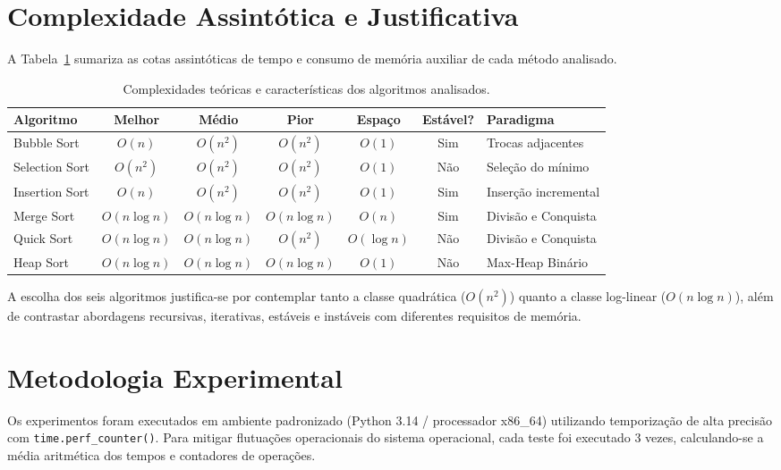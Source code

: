\documentclass[12pt,a4paper]{article}
\begin{document}
\section{Complexidade Assintótica e Justificativa}
A Tabela~\ref{tab:complexidade} sumariza as cotas assintóticas de tempo e consumo de memória auxiliar de cada método analisado.

\begin{table}[H]
\centering
\caption{Complexidades teóricas e características dos algoritmos analisados.}
\label{tab:complexidade}
\small
\begin{tabular}{@{}lcccccl@{}}
\toprule
\textbf{Algoritmo} & \textbf{Melhor} & \textbf{Médio} & \textbf{Pior} & \textbf{Espaço} & \textbf{Estável?} & \textbf{Paradigma} \\ \midrule
Bubble Sort & $O(n)$ & $O(n^2)$ & $O(n^2)$ & $O(1)$ & Sim & Trocas adjacentes \\
Selection Sort & $O(n^2)$ & $O(n^2)$ & $O(n^2)$ & $O(1)$ & Não & Seleção do mínimo \\
Insertion Sort & $O(n)$ & $O(n^2)$ & $O(n^2)$ & $O(1)$ & Sim & Inserção incremental \\
Merge Sort & $O(n \log n)$ & $O(n \log n)$ & $O(n \log n)$ & $O(n)$ & Sim & Divisão e Conquista \\
Quick Sort & $O(n \log n)$ & $O(n \log n)$ & $O(n^2)$ & $O(\log n)$ & Não & Divisão e Conquista \\
Heap Sort & $O(n \log n)$ & $O(n \log n)$ & $O(n \log n)$ & $O(1)$ & Não & Max-Heap Binário \\ \bottomrule
\end{tabular}
\end{table}

A escolha dos seis algoritmos justifica-se por contemplar tanto a classe quadrática ($O(n^2)$) quanto a classe log-linear ($O(n \log n)$), além de contrastar abordagens recursivas, iterativas, estáveis e instáveis com diferentes requisitos de memória.

\section{Metodologia Experimental}
Os experimentos foram executados em ambiente padronizado (Python 3.14 / processador x86\_64) utilizando temporização de alta precisão com \texttt{time.perf\_counter()}. Para mitigar flutuações operacionais do sistema operacional, cada teste foi executado 3 vezes, calculando-se a média aritmética dos tempos e contadores de operações.
\end{document}
